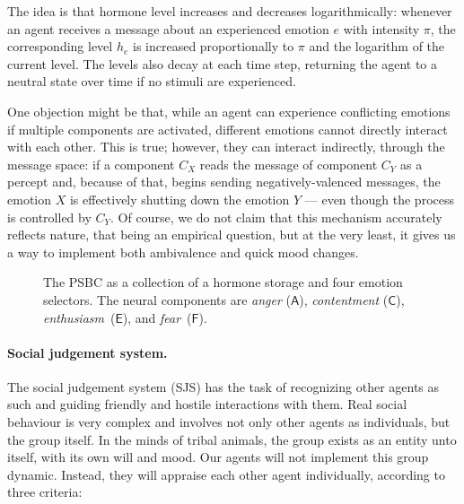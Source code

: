 The idea is that hormone level increases and decreases logarithmically: whenever an agent receives a message about an experienced emotion $e$ with intensity $\pi$, the corresponding level $h_e$ is increased proportionally to $\pi$ and the logarithm of the current level. The levels also decay at each time step, returning the agent to a neutral state over time if no stimuli are experienced.

One objection might be that, while an agent can experience conflicting emotions if multiple components are activated, different emotions cannot directly interact with each other. This is true; however, they can interact indirectly, through the message space: if a component $C_X$ reads the message of component $C_Y$ as a percept and, because of that, begins sending negatively-valenced messages, the emotion $X$ is effectively shutting down the emotion $Y$ --- even though the process is controlled by $C_Y$. Of course, we do not claim that this mechanism accurately reflects nature, that being an empirical question, but at the very least, it gives us a way to implement both ambivalence and quick mood changes.

\begin{figure}[t]
	\centering
	
	\caption{The PSBC as a collection of a hormone storage and four emotion selectors. The neural components are {\em anger} ($\mathsf{A}$), {\em contentment} ($\mathsf{C}$), {\em enthusiasm}~($\mathsf{E}$), and {\em fear}~($\mathsf{F}$).}
	\label{fig:PSBC_system}
\end{figure}

\paragraph{Social judgement system.} The social judgement system (SJS) has the task of recognizing other agents as such and guiding friendly and hostile interactions with them. Real social behaviour is very complex and involves not only other agents as individuals, but the group itself. In the minds of tribal animals, the group exists as an entity unto itself, with its own will and mood. Our agents will not implement this group dynamic. Instead, they will appraise each other agent individually, according to three criteria:

